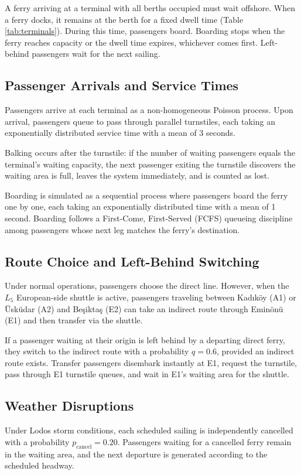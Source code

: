 \documentclass[11pt,a4paper]{article}
\begin{document}
A ferry arriving at a terminal with all berths occupied must wait offshore. When a ferry docks, it remains at the berth for a fixed dwell time (Table \ref{tab:terminals}). During this time, passengers board. Boarding stops when the ferry reaches capacity or the dwell time expires, whichever comes first. Left-behind passengers wait for the next sailing.

\subsection{Passenger Arrivals and Service Times}
Passengers arrive at each terminal as a non-homogeneous Poisson process. Upon arrival, passengers queue to pass through parallel turnstiles, each taking an exponentially distributed service time with a mean of 3 seconds. 

Balking occurs after the turnstile: if the number of waiting passengers equals the terminal's waiting capacity, the next passenger exiting the turnstile discovers the waiting area is full, leaves the system immediately, and is counted as lost.

Boarding is simulated as a sequential process where passengers board the ferry one by one, each taking an exponentially distributed time with a mean of 1 second. Boarding follows a First-Come, First-Served (FCFS) queueing discipline among passengers whose next leg matches the ferry's destination.

\subsection{Route Choice and Left-Behind Switching}
Under normal operations, passengers choose the direct line. However, when the $L_5$ European-side shuttle is active, passengers traveling between Kad\i k\"{o}y (A1) or \"Usk\"{u}dar (A2) and Be\c{s}ikta\c{s} (E2) can take an indirect route through Emin\"{o}n\"{u} (E1) and then transfer via the shuttle. 

If a passenger waiting at their origin is left behind by a departing direct ferry, they switch to the indirect route with a probability $q = 0.6$, provided an indirect route exists. Transfer passengers disembark instantly at E1, request the turnstile, pass through E1 turnstile queues, and wait in E1's waiting area for the shuttle.

\subsection{Weather Disruptions}
Under Lodos storm conditions, each scheduled sailing is independently cancelled with a probability $p_{\text{cancel}} = 0.20$. Passengers waiting for a cancelled ferry remain in the waiting area, and the next departure is generated according to the scheduled headway.
\end{document}
